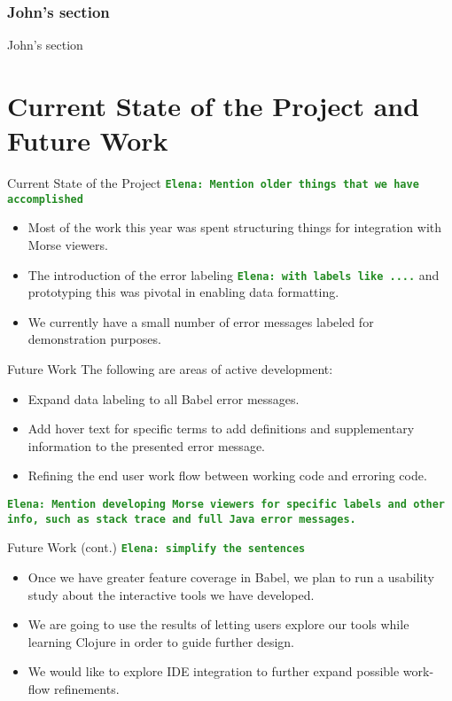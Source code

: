 \documentclass{beamer}
\newcommand{\comment}[1]{{\bf \tt  {#1}}}
\newcommand{\emcomment}[1]{\textcolor{ForestGreen}{\comment{Elena: {#1}}}}
\begin{document}
\begin{frame}
\frametitle{John's section}

John's section
\end{frame}

\section{Current State of the Project and Future Work}
\begin{frame}{Current State of the Project}
\emcomment{Mention older things that we have accomplished}
  \begin{itemize}
    \item<1-> Most of the work this year was spent structuring things for integration with Morse viewers.
    \item<2-> The introduction of the error labeling \emcomment{with labels like ....} and prototyping this was pivotal in enabling data formatting.
    \item<3-> We currently have a small number of error messages labeled for demonstration purposes.
  \end{itemize}
\end{frame}

\begin{frame}{Future Work}
  The following are areas of active development:
  \begin{itemize}
    \item<1-> Expand data labeling to all Babel error messages.
    \item<2-> Add hover text for specific terms to add definitions and supplementary information to the presented error message.
    \item<3-> Refining the end user work flow between working code and erroring code.
  \end{itemize}
\emcomment{Mention developing Morse viewers for specific labels and other info, such as stack trace and full Java error messages.}
  \end{frame}

\begin{frame}{Future Work (cont.)}
\emcomment{simplify the sentences}
  \begin{itemize}
    \item<1-> Once we have greater feature coverage in Babel, we plan to run a usability study about the interactive tools we have developed.
    \item<2-> We are going to use the results of letting users explore our tools while learning Clojure in order to guide further design. 
    \item<3-> We would like to explore IDE integration to further expand possible work-flow refinements.
  \end{itemize}
\end{frame}
\end{document}
